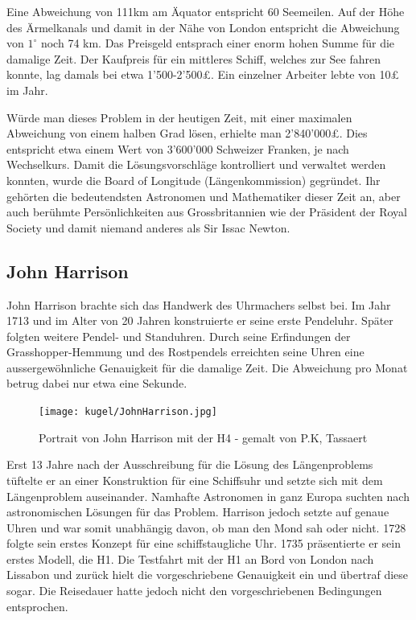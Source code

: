 \begin{refsection}
Eine Abweichung von 111km am Äquator entspricht 60 Seemeilen.
Auf der Höhe des Ärmelkanals und damit in der Nähe von London entspricht die Abweichung von $1 ^{\circ}$ noch 74 km.
Das Preisgeld entsprach einer enorm hohen Summe für die damalige Zeit. Der Kaufpreis für ein mittleres Schiff, welches zur See fahren konnte, lag damals bei etwa 1’500-2’500£. Ein einzelner Arbeiter lebte von 10£ im Jahr.

Würde man dieses Problem in der heutigen Zeit, mit einer maximalen Abweichung von einem halben Grad lösen, erhielte man 2’840’000£. Dies entspricht etwa einem Wert von 3’600’000 Schweizer Franken, je nach Wechselkurs.
Damit die Lösungsvorschläge kontrolliert und verwaltet werden konnten, wurde die Board of Longitude (Längenkommission) gegründet. Ihr gehörten die bedeutendsten Astronomen und Mathematiker dieser Zeit an, aber auch berühmte Persönlichkeiten aus Grossbritannien wie der Präsident der Royal Society und damit niemand anderes als Sir Issac Newton.



\subsection{John Harrison}
John Harrison brachte sich das Handwerk des Uhrmachers selbst bei. Im Jahr 1713 und im Alter von 20 Jahren konstruierte er seine erste Pendeluhr. Später folgten weitere Pendel- und Standuhren. Durch seine Erfindungen der Grasshopper-Hemmung und des Rostpendels erreichten seine Uhren eine aussergewöhnliche Genauigkeit für die damalige Zeit. Die Abweichung pro Monat betrug dabei nur etwa eine Sekunde.

\begin{figure}[htbp]
\centering
\texttt{[image: kugel/JohnHarrison.jpg]}
\caption{Portrait von John Harrison mit der H4 - gemalt von P.K, Tassaert}
\end{figure}

Erst 13 Jahre nach der Ausschreibung für die Lösung des Längenproblems tüftelte er an einer Konstruktion für eine Schiffsuhr und setzte sich mit dem Längenproblem auseinander.
Namhafte Astronomen in ganz Europa suchten nach astronomischen Lösungen für das Problem. Harrison jedoch setzte auf genaue Uhren und war somit unabhängig davon, ob man den Mond sah oder nicht.
1728 folgte sein erstes Konzept für eine schiffstaugliche Uhr. 1735 präsentierte er sein erstes Modell, die H1. Die Testfahrt mit der H1 an Bord von London nach Lissabon und zurück hielt die vorgeschriebene Genauigkeit ein und übertraf diese sogar. Die Reisedauer hatte jedoch nicht den vorgeschriebenen Bedingungen entsprochen.


\end{refsection}
